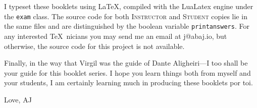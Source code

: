 \begin{instructor}
    I typeset these booklets using \LaTeX, compiled with the LuaLatex engine under the \texttt{exam} class. The source code for both \textsc{Instructor} and \textsc{Student} copies lie in the same files and are distinguished by the boolean variable \texttt{printanswers}. For any interested \TeX\ nicians you may send me an email at j@abaj.io, but otherwise, the source code for this project is not available.

    Finally, in the way that Virgil was the guide of Dante Aligheiri---I too shall be your guide for this booklet series. I hope you learn things both from myself and your students, I am certainly learning much in producing these booklets por toi.

    Love,
    AJ
\end{instructor}
